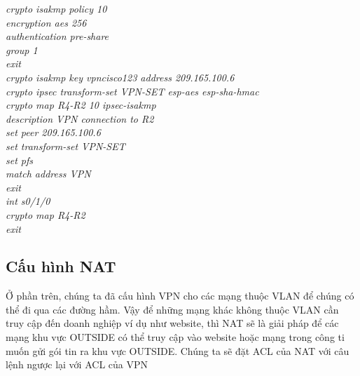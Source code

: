 \documentclass[a4paper, 12pt]{article}
\begin{document}
\hspace*{2cm}\textit{crypto isakmp policy 10\\
\hspace*{2cm}encryption aes 256\\
\hspace*{2cm}authentication pre-share\\
\hspace*{2cm}group 1\\
\hspace*{2cm}exit\\
\hspace*{2cm}crypto isakmp key vpncisco123 address 209.165.100.6\\
\hspace*{2cm}crypto ipsec transform-set VPN-SET esp-aes esp-sha-hmac\\
\hspace*{2cm}crypto map R4-R2 10 ipsec-isakmp\\
\hspace*{2cm}description VPN connection to R2\\
\hspace*{2cm}set peer 209.165.100.6\\
\hspace*{2cm}set transform-set VPN-SET\\
\hspace*{2cm}set pfs\\
\hspace*{2cm}match address VPN\\
\hspace*{2cm}exit \\
\hspace*{2cm}int s0/1/0\\
\hspace*{2cm}crypto map R4-R2\\
\hspace*{2cm}exit\\}

\subsection{Cấu hình NAT}
\hspace*{1cm}Ở phần trên, chúng ta đã cấu hình VPN cho các mạng thuộc VLAN để chúng có thể đi qua các đường hầm. Vậy để những mạng khác không thuộc VLAN cần truy cập đến doanh nghiệp ví dụ như website, thì NAT sẽ là giải pháp để các mạng khu vực OUTSIDE có thể truy cập vào website hoặc mạng trong công ti muốn gửi gói tin ra khu vực OUTSIDE. Chúng ta sẽ đặt ACL của NAT với câu lệnh ngược lại với ACL của VPN\\
\end{document}

